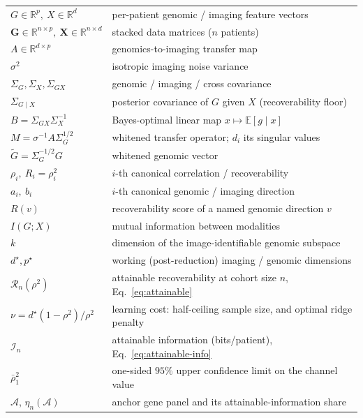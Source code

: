 \documentclass{article}
\newcommand{\R}{\mathbb{R}}
\newcommand{\E}{\mathbb{E}}
\newcommand{\Sg}{\Sigma_{G}}
\newcommand{\Sx}{\Sigma_{X}}
\newcommand{\Sgx}{\Sigma_{GX}}
\newcommand{\Sgcx}{\Sigma_{G\mid X}}
\begin{document}
\noindent
\begin{tabular}{ll}
$G \in \R^p,\ X \in \R^d$ & per-patient genomic / imaging feature vectors\\
$\mathbf{G} \in \R^{n\times p},\ \mathbf{X} \in \R^{n\times d}$ & stacked data matrices ($n$ patients)\\
$A \in \R^{d\times p}$ & genomics-to-imaging transfer map\\
$\sigma^2$ & isotropic imaging noise variance\\
$\Sg, \Sx, \Sgx$ & genomic / imaging / cross covariance\\
$\Sgcx$ & posterior covariance of $G$ given $X$ (recoverability floor)\\
$B = \Sgx \Sx^{-1}$ & Bayes-optimal linear map $x \mapsto \E[g\mid x]$\\
$M = \sigma^{-1} A \Sg^{1/2}$ & whitened transfer operator; $d_i$ its singular values\\
$\tilde{G} = \Sg^{-1/2} G$ & whitened genomic vector\\
$\rho_i,\ R_i = \rho_i^2$ & $i$-th canonical correlation / recoverability\\
$a_i,\ b_i$ & $i$-th canonical genomic / imaging direction\\
$R(v)$ & recoverability score of a named genomic direction $v$\\
$I(G;X)$ & mutual information between modalities\\
$k$ & dimension of the image-identifiable genomic subspace\\
$d^\star, p^\star$ & working (post-reduction) imaging / genomic dimensions\\
$\mathcal{R}_n(\rho^2)$ & attainable recoverability at cohort size $n$, Eq.~\eqref{eq:attainable}\\
$\nu = d^\star(1-\rho^2)/\rho^2$ & learning cost: half-ceiling sample size, and optimal ridge penalty\\
$\mathcal{I}_n$ & attainable information (bits/patient), Eq.~\eqref{eq:attainable-info}\\
$\bar\rho_1^2$ & one-sided $95\%$ upper confidence limit on the channel value\\
$\mathcal{A}$, $\eta_n(\mathcal{A})$ & anchor gene panel and its attainable-information share\\
\end{tabular}



\end{document}
